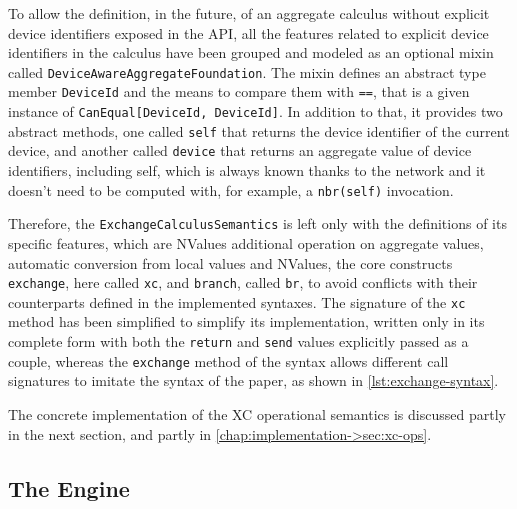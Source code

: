 To allow the definition, in the future, of an aggregate calculus without explicit device identifiers exposed in the \ac{API}, all the features related to explicit device identifiers in the calculus have been grouped and modeled as an optional mixin called \texttt{DeviceAwareAggregateFoundation}.
%
The mixin defines an abstract type member \texttt{DeviceId} and the means to compare them with \texttt{==}, that is a given instance of \texttt{CanEqual[DeviceId, DeviceId]}.
%
In addition to that, it provides two abstract methods, one called \texttt{self} that returns the device identifier of the current device, and another called \texttt{device} that returns an aggregate value of device identifiers, including self, which is always known thanks to the network and it doesn't need to be computed with, for example, a \texttt{nbr(self)} invocation.

Therefore, the \texttt{ExchangeCalculusSemantics} is left only with the definitions of its specific features, which are NValues additional operation on aggregate values, automatic conversion from local values and NValues, the core constructs \texttt{exchange}, here called \texttt{xc}, and \texttt{branch}, called \texttt{br}, to avoid conflicts with their counterparts defined in the implemented syntaxes.
%
The signature of the \texttt{xc} method has been simplified to simplify its implementation, written only in its complete form with both the \texttt{return} and \texttt{send} values explicitly passed as a couple, whereas the \texttt{exchange} method of the syntax allows different call signatures to imitate the syntax of the paper\cite{xc}, as shown in \cref{lst:exchange-syntax}.



The concrete implementation of the \ac{XC} operational semantics is discussed partly in the next section, and partly in \cref{chap:implementation->sec:xc-ops}.

\subsection{The Engine} \label{chap:design->sec:final-dsl->subsec:engine}


